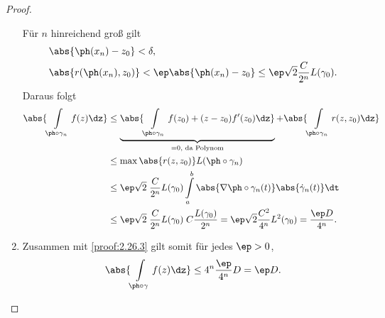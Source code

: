 \begin{proof}
\begin{enumerate}[label=\arabic{*}.)]
Für $n$ hinreichend groß gilt
\begin{align*}
&\abs{\ph(x_n) - z_0} < \delta,\\
&\abs{r(\ph(x_n),z_0)} < \ep\abs{\ph(x_n)-z_0} \le \ep\sqrt{2} \frac{C}{2^n}
L(\gamma_0).
\end{align*}
Daraus folgt
\begin{align*}
\abs{\int\limits_{\ph\circ\gamma_n} f(z) \dz} &\le
\underbrace{\abs{\int\limits_{\ph\circ\gamma_n} f(z_0) + (z-z_0)f'(z_0) \dz}}_{=
0, \text{ da Polynom}} +
\abs{\int\limits_{\ph\circ\gamma_n} r(z,z_0) \dz} \\ &\le \max \abs{r(z,z_0)}
L(\ph\circ \gamma_n)\\
&\le \ep\sqrt{2}\; \frac{C}{2^n} L(\gamma_0) \int\limits_a^b \abs{\nabla
\ph\circ\gamma_n(t)}\abs{\dot{\gamma}_n(t)}\dt \\
&\le \ep\sqrt{2}\; \frac{C}{2^n} L(\gamma_0)\; C \frac{L(\gamma_0)}{2^n}
= \ep \sqrt{2} \frac{C^2}{4^n} L^2(\gamma_0) = \frac{\ep D}{4^n}.
\end{align*}
\item Zusammen mit \ref{proof:2.26.3} gilt somit für jedes $\ep > 0$,
\begin{align*}
\abs{\int\limits_{\ph\circ\gamma} f(z)\dz} \le 4^n \frac{\ep}{4^n}D = \ep
D.\qedhere
\end{align*}
\end{enumerate}
\end{proof}

